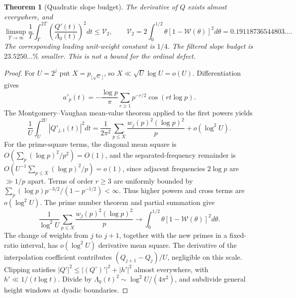 \documentclass[11pt,reqno]{amsart}
\makeatletter
\let\CG@origcite\cite
\renewcommand*{\cite}[2][]{\def\CG@citekey{#2}%
  \ifx\relax#1\relax\CG@origcite{#2}\else\CG@origcite[#1]{#2}\fi}
\numberwithin{equation}{section}
\newtheorem{theorem}{Theorem}[section]
\theoremstyle{definition}
\theoremstyle{remark}
\makeatother
\begin{document}
\begin{theorem}[Quadratic slope budget]\label{thm:tauC2_slope_v7}
The derivative of $Q$ exists almost everywhere, and
\begin{equation}
 \limsup_{T\to\infty}\frac1T\int_T^{2T}
 \left(\frac{Q'(t)}{\Lambda_0(t)}\right)^2dt
 \le\mathcal V_2,\qquad
 \mathcal V_2=2\int_0^{1/2}\theta
 [1-\mathscr W(\theta)]^2d\theta
 =0.19118736544803\ldots .
 \label{eq:tauC2_slope_v7}
\end{equation}
The corresponding leading unit-weight constant is $1/4$.
The filtered slope budget is $23.5250\ldots\%$ smaller.
This is not a bound for the ordinal defect.
\end{theorem}
\begin{proof}
For $U=2^j$ put $X=p_{\lfloor\sqrt U\rfloor}$,
so $X\ll\sqrt U\log U=o(U)$. Differentiation gives
\[
 a'_p(t)=-\frac{\log p}{\pi}\sum_{r\ge1}
 p^{-r/2}\cos(rt\log p).
\]
The Montgomery--Vaughan mean-value theorem
\cite{MontgomeryVaughan1974} applied to the first powers yields
\[
 \frac1U\int_U^{2U}|Q'_{j,1}(t)|^2dt
 =\frac1{2\pi^2}\sum_{p\le X}
 \frac{w_j(p)^2(\log p)^2}{p}+o(\log^2 U).
\]
For the prime-square terms, the diagonal mean square is
$O(\sum_p(\log p)^2/p^2)=O(1)$, and the
separated-frequency remainder is
$O(U^{-1}\sum_{p\le X}(\log p)^2/p)=o(1)$,
since adjacent frequencies $2\log p$ are $\gg1/p$ apart.
Terms of order $r\ge3$ are uniformly bounded by
$\sum_p(\log p)p^{-3/2}/(1-p^{-1/2})<\infty$.
Thus higher powers and cross terms are $o(\log^2U)$.
The prime number theorem and partial summation give
\[
 \frac1{\log^2U}\sum_{p\le X}
 \frac{w_j(p)^2(\log p)^2}{p}
 \longrightarrow
 \int_0^{1/2}\theta[1-\mathscr W(\theta)]^2d\theta.
\]
The change of weights from $j$ to $j+1$, together with the
new primes in a fixed-ratio interval, has
$o(\log^2 U)$ derivative mean square. The derivative of
the interpolation coefficient contributes
$(Q_{j+1}-Q_j)/U$, negligible on this scale.
Clipping satisfies $|Q'|^2\le|(Q^\circ)'|^2+|h'|^2$
almost everywhere, with $h'\ll1/(t\log t)$.
Divide by $\Lambda_0(t)^2\sim\log^2U/(4\pi^2)$,
and subdivide general height windows at dyadic boundaries.
\end{proof}
\end{document}
